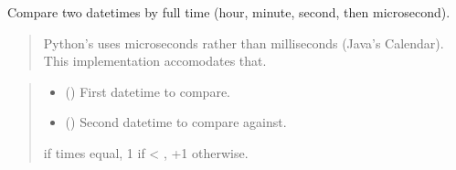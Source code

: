 \documentclass[letterpaper,10pt,english]{sphinxmanual}
\begin{document}
\begin{fulllineitems}
\begin{fulllineitems}
\begin{quote}
\begin{description}
\end{description}\end{quote}

\end{fulllineitems}


\begin{fulllineitems}
\label{\detokenize{apache_commons_validator_python.routines:apache_commons_validator_python.routines.time_validator.TimeValidator.compare_time}}
\pysigstartsignatures
{}
\pysigstopsignatures
\sphinxAtStartPar
Compare two datetimes by full time (hour, minute, second, then microsecond).
\begin{quote}
\begin{description}
\sphinxAtStartPar
Python’s  uses microseconds rather than milliseconds (Java’s Calendar).
This implementation accomodates that.

\end{description}
\end{quote}
\begin{quote}\begin{description}
\begin{itemize}
\item {} 
\sphinxAtStartPar
{} () \textendash{} First datetime to compare.

\item {} 
\sphinxAtStartPar
{} () \textendash{} Second datetime to compare against.

\end{itemize}

 if times equal, \sphinxhyphen{}1 if  \textless{} , +1 otherwise.


\end{description}
\end{quote}
\end{fulllineitems}
\end{fulllineitems}
\end{document}
